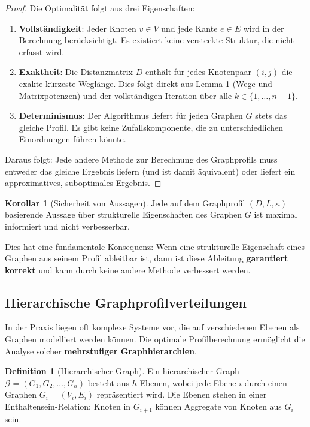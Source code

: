 ﻿\documentclass[a4paper,12pt]{article}
\theoremstyle{definition}
\newtheorem{definition}{Definition}
\newtheorem{korollar}{Korollar}
\begin{document}
	\begin{proof}
		Die Optimalität folgt aus drei Eigenschaften:
		\begin{enumerate}
			\item \textbf{Vollständigkeit}: Jeder Knoten $v \in V$ und jede Kante $e \in E$ wird in der Berechnung berücksichtigt. Es existiert keine versteckte Struktur, die nicht erfasst wird.
			\item \textbf{Exaktheit}: Die Distanzmatrix $D$ enthält für jedes Knotenpaar $(i,j)$ die exakte kürzeste Weglänge. Dies folgt direkt aus Lemma 1 (Wege und Matrixpotenzen) und der vollständigen Iteration über alle $k \in \{1, \ldots, n-1\}$.
			\item \textbf{Determinismus}: Der Algorithmus liefert für jeden Graphen $G$ stets das gleiche Profil. Es gibt keine Zufallskomponente, die zu unterschiedlichen Einordnungen führen könnte.
		\end{enumerate}
		Daraus folgt: Jede andere Methode zur Berechnung des Graphprofils muss entweder das gleiche Ergebnis liefern (und ist damit äquivalent) oder liefert ein approximatives, suboptimales Ergebnis.
	\end{proof}
	
	\begin{korollar}[Sicherheit von Aussagen]
		Jede auf dem Graphprofil $(D, L, \kappa)$ basierende Aussage über strukturelle Eigenschaften des Graphen $G$ ist maximal informiert und nicht verbesserbar.
	\end{korollar}
	
	Dies hat eine fundamentale Konsequenz: Wenn eine strukturelle Eigenschaft eines Graphen aus seinem Profil ableitbar ist, dann ist diese Ableitung \textbf{garantiert korrekt} und kann durch keine andere Methode verbessert werden.
	
	\subsection{Hierarchische Graphprofilverteilungen}
	
	In der Praxis liegen oft komplexe Systeme vor, die auf verschiedenen Ebenen als Graphen modelliert werden können. Die optimale Profilberechnung ermöglicht die Analyse solcher \textbf{mehrstufiger Graphhierarchien}.
	
	\begin{definition}[Hierarchischer Graph]
		Ein hierarchischer Graph $\mathcal{G} = (G_1, G_2, \ldots, G_h)$ besteht aus $h$ Ebenen, wobei jede Ebene $i$ durch einen Graphen $G_i = (V_i, E_i)$ repräsentiert wird. Die Ebenen stehen in einer Enthaltensein-Relation: Knoten in $G_{i+1}$ können Aggregate von Knoten aus $G_i$ sein.
	\end{definition}
	
\end{document}

